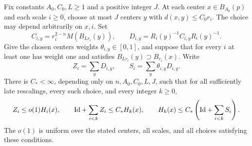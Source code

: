 \begin{lemma}
\label{co:cumulative-comparison}
Fix constants \(A_0,C_0,L\ge1\) and a positive integer \(J\).
At each center
\(x\in B_{A_0}(p)\) and each scale \(i\ge0\), choose at most \(J\)
centers \(y\) with \(d(x,y)\le C_0r_i\).  The choice may depend
arbitrarily on \(x,i\).  Set
\begin{equation}\label{co:D-definition}
 C_{i,y}=r_i^{2-n}M(B_{Lr_i}(y)),
 \qquad D_{i,y}=R_i(y)^{-1}C_{i,y}R_i(y)^{-1}.
\end{equation}
Give the chosen centers weights \(\theta_{i,y}\in[0,1]\), and
suppose that for every \(i\) at least one has weight one and
satisfies \(B_{Lr_i}(y)\supset B_{r_i}(x)\).  Write
\begin{equation}\label{co:ZS-definition}
 Z_i=\sum_yD_{i,y},\qquad
 S_i=\sum_y\theta_{i,y}D_{i,y}.
\end{equation}
There is \(C_*<\infty\), depending only on \(n,A_0,C_0,L,J\),
such that for all sufficiently late rescalings, every such choice,
and every integer \(k\ge0\),
\begin{equation}\label{co:cumulative-estimates}
 Z_i\le o(1)H_i(x),\qquad
 \mathrm{Id}+\sum_{i<k}Z_i\le C_*H_k(x),\qquad
 H_k(x)\le C_*\left(\mathrm{Id}+\sum_{i<k}S_i\right).
\end{equation}
The \(o(1)\) is uniform over the stated centers, all scales, and
all choices satisfying these conditions.
\end{lemma}

